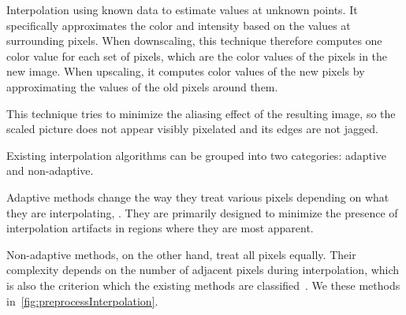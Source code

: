 Interpolation  using known data to estimate values at unknown points. It specifically approximates the  color and intensity based on the values at surrounding pixels. When downscaling, this technique therefore computes one color value for each set of pixels, which are the color values of the pixels in the new image. When upscaling, it computes color values of the new pixels by approximating the values of the old pixels around them.

This technique tries to minimize the aliasing effect of the resulting image, so the scaled picture does not appear visibly pixelated and its edges are not jagged.

Existing interpolation algorithms can be grouped into two categories: adaptive and non-adaptive.

Adaptive methods change the way they treat various pixels depending on what they are interpolating, . They are primarily designed to minimize the presence of interpolation artifacts in regions where they are most apparent.

Non-adaptive methods, on the other hand, treat all pixels equally. Their complexity depends on the number of adjacent pixels during interpolation, which is also the criterion   which the existing methods are classified~\cite{interpolation}. We  these methods in~\cref{fig:preprocessInterpolation}.

